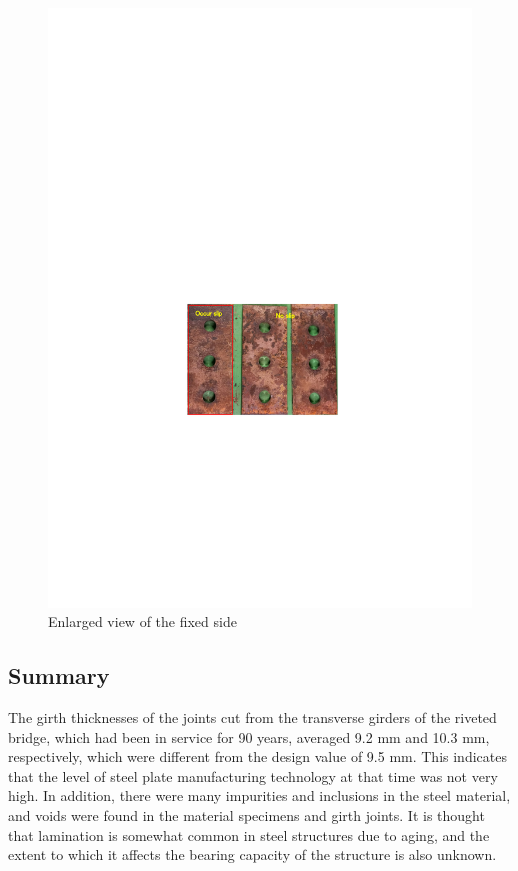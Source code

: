 \begin{figure}[htbp]
\begin{minipage}[t]{0.45\textwidth}
    \includegraphics[width=\linewidth]{imgs/ch3/fig3-30.pdf}
    \caption{Enlarged view of the fixed side}
    \label{fig3-30}
    \end{minipage}
\end{figure} 

\subsection{Summary}

The girth thicknesses of the joints cut from the transverse girders of the riveted bridge, which had been in service for 90 years, averaged 9.2 mm and 10.3 mm, respectively, which were different from the design value of 9.5 mm. This indicates that the level of steel plate manufacturing technology at that time was not very high. In addition, there were many impurities and inclusions in the steel material, and voids were found in the material specimens and girth joints. It is thought that lamination is somewhat common in steel structures due to aging, and the extent to which it affects the bearing capacity of the structure is also unknown.

